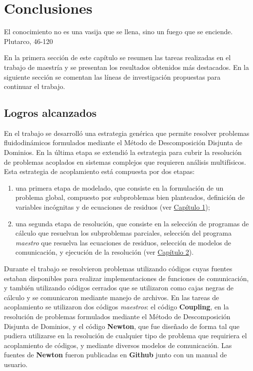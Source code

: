 \chapter{Conclusiones}
\label{conclusiones}
\chapterquote
{El conocimiento no es una vasija que se llena, sino un fuego que se enciende.}
{Plutarco, 46-120}

En la primera sección de este capítulo se resumen las tareas realizadas en el trabajo de maestría y se presentan los resultados obtenidos más destacados.
En la siguiente sección se comentan las líneas de investigación propuestas para continuar el trabajo.

\section{Logros alcanzados}
\label{logros}

En el trabajo se desarrolló una estrategia genérica que permite resolver problemas fluidodinámicos formulados mediante el Método de Descomposición Disjunta de Dominios.
En la última etapa se extendió la estrategia para cubrir la resolución de problemas acoplados en sistemas complejos que requieren análisis multifísicos.
Esta estrategia de acoplamiento está compuesta por dos etapas:
\begin{enumerate}
\item una primera etapa de modelado, que consiste en la formulación de un problema global, compuesto por subproblemas bien planteados, definición de variables incógnitas y de ecuaciones de residuos (ver \hyperlink{chapter.1}{Capítulo 1});
\item una segunda etapa de resolución, que consiste en la selección de programas de cálculo que resuelvan los subproblemas parciales,
selección del programa \textit{maestro} que resuelva las ecuaciones de residuos, selección de modelos de comunicación, y ejecución de la resolución (ver \hyperlink{chapter.2}{Capítulo 2}).
\end{enumerate}

Durante el trabajo se resolvieron problemas utilizando códigos cuyas fuentes estaban disponibles para realizar implementaciones de funciones de comunicación,
y también utilizando códigos cerrados que se utilizaron como cajas negras de cálculo y se comunicaron mediante manejo de archivos.
En las tareas de acoplamiento se utilizaron dos códigos \textit{maestros}: el código \textbf{Coupling}, en la resolución de problemas formulados mediante el Método de Descomposición Disjunta de Dominios,
y el código \textbf{Newton}, que fue diseñado de forma tal que pudiera utilizarse en la resolución de cualquier tipo de problema que requiriera el acoplamiento de códigos,
y mediante diversos modelos de comunicación.
Las fuentes de \textbf{Newton} fueron publicadas en \textbf{Github} junto con un manual de usuario.

